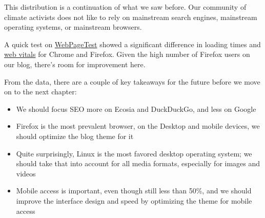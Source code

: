 This distribution is a continuation of what we saw before. Our community of climate activists does not like to rely on mainstream search engines, mainstream operating systems, or mainstream browsers.

A quick test on \href{https://webpagetest.org/}{WebPageTest} showed a significant difference in loading times and \href{https://web.dev/vitals/}{web vitals} for Chrome and Firefox. Given the high number of Firefox users on our blog, there's room for improvement here.

From the data, there are a couple of key takeaways for the future before we move on to the next chapter:

\begin{itemize}
 \item We should focus SEO more on Ecosia and DuckDuckGo, and less on Google
 \item Firefox is the most prevalent browser, on the Desktop and mobile devices, we should optimize the blog theme for it
 \item Quite surprisingly, Linux is the most favored desktop operating system; we should take that into account for all media formats, especially for images and videos
 \item Mobile access is important, even though still less than 50\%, and we should improve the interface design and speed by optimizing the theme for mobile access
\end{itemize}
